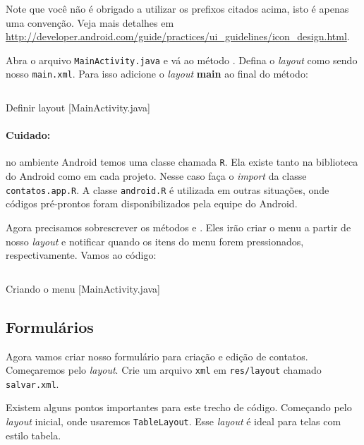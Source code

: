 Note que você não é obrigado a utilizar os prefixos citados acima, isto é apenas uma convenção.
Veja mais detalhes em \url{http://developer.android.com/guide/practices/ui_guidelines/icon_design.html}.

Abra o arquivo \texttt{MainActivity.java} e vá ao método . Defina o \textit{layout} como
sendo nosso \texttt{main.xml}. Para isso adicione o \textit{layout} \textbf{main} ao final do método:

\begin{listing}[H]
  \inputminted[linenos=true,frame=bottomline,tabsize=3]{ java }{ source/MainActivity-1.java }
  \caption{Definir layout [MainActivity.java]}
\end{listing}

\paragraph{Cuidado:} no ambiente Android temos uma classe chamada \texttt{R}. Ela existe tanto
na biblioteca do Android como em cada projeto. Nesse caso faça o \textit{import} da classe
\texttt{contatos.app.R}. A classe \texttt{android.R} é utilizada em outras situações, onde códigos
pré-prontos foram disponibilizados pela equipe do Android.

Agora precisamos sobrescrever os métodos  e .
Eles irão criar o menu a partir de nosso \textit{layout} e notificar quando os itens do menu forem
pressionados, respectivamente. Vamos ao código:

\begin{listing}[H]
  \inputminted[linenos=true,frame=bottomline,tabsize=3]{ java }{ source/MainActivity-2.java }
  \caption{Criando o menu [MainActivity.java]}
\end{listing}

\subsection{Formulários}

Agora vamos criar nosso formulário para criação e edição de contatos. Começaremos pelo \textit{layout}.
Crie um arquivo \texttt{xml} em \texttt{res/layout} chamado \texttt{salvar.xml}.

Existem alguns pontos importantes para este trecho de código. Começando pelo \textit{layout} inicial,
onde usaremos \texttt{TableLayout}. Esse \textit{layout} é ideal para telas com estilo tabela.

